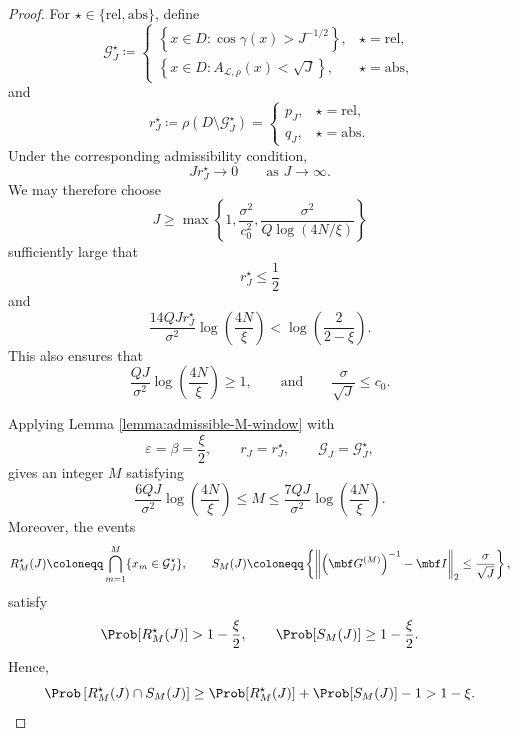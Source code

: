 \documentclass[10pt,dvipsnames]{amsart}
\begin{document}
\finiteSampleWeightApprox*
\begin{proof} For
\(\star\in\{\mathrm{rel},\mathrm{abs}\}\), define
\[
    \mathcal G_J^\star
    \coloneqq
    \begin{cases}
        \left\{
            x\in D:
            \cos\gamma(x)>J^{-1/2}
        \right\},
        & \star=\mathrm{rel},\\[0.3em]
        \left\{
            x\in D:
            A_{\mathcal L,\rho}(x)<\sqrt J
        \right\},
        & \star=\mathrm{abs},
    \end{cases}
\]
and
\[
    r_J^\star
    \coloneqq
    \rho(D\setminus\mathcal G_J^\star)
    =
    \begin{cases}
        p_J,
        & \star=\mathrm{rel},\\
        q_J,
        & \star=\mathrm{abs}.
    \end{cases}
\]
Under the corresponding admissibility condition,
\[
    Jr_J^\star\longrightarrow0
    \qquad\text{as }J\to\infty.
\]
We may therefore choose
\begin{equation}\label{eq:J-treshold}
    J\geq
    \max\left\{
        1,
        \frac{\sigma^2}{c_0^2},
        \frac{\sigma^2}{Q\log(4N/\xi)}
    \right\}
\end{equation}
sufficiently large that
\[
    r_J^\star\leq\frac12
\]
and
\begin{equation}
\label{eq:weight-window-choice}
    \frac{14QJr_J^\star}{\sigma^2}\log\left(\frac{4N}{\xi}\right)
    <
    \log\left(\frac{2}{2-\xi}\right).
\end{equation}
This also ensures that
\[
    \frac{QJ}{\sigma^2}\log\left(\frac{4N}{\xi}\right)\geq1,
    \qquad\text{and}\qquad
    \frac{\sigma}{\sqrt J}\leq c_0.
\]

Applying Lemma \ref{lemma:admissible-M-window} with
\[
    \varepsilon=\beta=\frac{\xi}{2},
    \qquad
    r_J=r_J^\star,
    \qquad
    \mathcal G_J=\mathcal G_J^\star,
\]
gives an integer \(M\) satisfying
\begin{equation}
\label{eq:weight-M-window}
    \frac{6QJ}{\sigma^2}\log\left(\frac{4N}{\xi}\right)
    \leq
    M
    \leq
    \frac{7QJ}{\sigma^2}\log\left(\frac{4N}{\xi}\right).
\end{equation}
Moreover, the events
\[
    R_M^\star(J)
    \coloneqq
    \bigcap_{m=1}^M
    \{x_m\in\mathcal G_J^\star\},
\qquad 
    S_M(J)
    \coloneqq
    \left\{
        \left\|
            \left(\mbf G^{(M)}\right)^{-1}-\mbf I
        \right\|_2
        \leq
        \frac{\sigma}{\sqrt J}
    \right\},
\]
satisfy
\[
    \Prob[R_M^\star(J)]>1-\frac{\xi}{2},
    \qquad
    \Prob[S_M(J)]\geq1-\frac{\xi}{2}.
\]
Hence,
\[
    \Prob\left[
        R_M^\star(J)\cap S_M(J)
    \right]
    \geq
    \Prob[R_M^\star(J)]
    +
    \Prob[S_M(J)]
    -1
    >
    1-\xi.
\]


\end{proof}
\end{document}
